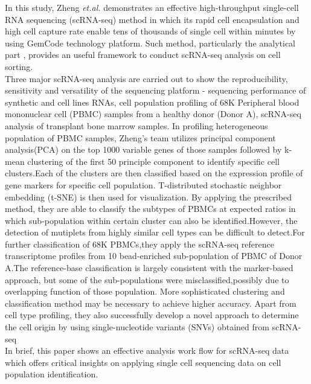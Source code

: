 \documentclass{article}
\begin{document}
\nocite{zheng2017massively}


  
\medskip

In this study, Zheng \textit{et.al.} demonstrates an effective high-throughput single-cell RNA sequencing (scRNA-seq) method in which its rapid cell encapsulation and high cell capture rate enable tens of thousands of single cell within minutes by using GemCode technology platform. Such method, particularly the analytical part , provides an useful framework to conduct scRNA-seq analysis on cell sorting.
\\

Three major scRNA-seq analysis are carried out to show the reproducibility, sensitivity and versatility of the sequencing platform - sequencing performance of synthetic and cell lines RNAs, cell population profiling of 68K Peripheral blood mononuclear cell (PBMC) samples from a healthy donor (Donor A), scRNA-seq analysis of transplant bone marrow samples. In profiling heterogeneous population of PBMC samples, Zheng's team utilizes principal component analysis(PCA) on the top 1000 variable genes of those samples followed by k-mean clustering of the first 50 principle component to identify specific cell clusters.Each of the clusters are then classified based on the expression profile of gene markers for specific cell population. T-distributed stochastic neighbor embedding (t-SNE) is then used for visualization. By applying the prescribed method, they are able to classify the subtypes of PBMCs at expected ratios in which sub-population within certain cluster can also be identified.However, the detection of mutiplets from highly similar cell types can be difficult to detect.For further classification of 68K PBMCs,they apply the scRNA-seq reference transcriptome profiles from 10 bead-enriched sub-population of PBMC of Donor A.The reference-base classification is largely consistent with the marker-based approach, but some of the sub-populations were misclassified,possibly due to overlapping function of those population. More sophisticated clustering and classification method may be necessary to achieve higher accuracy. Apart from cell type profiling, they also successfully develop a novel approach to determine the cell origin by using single-nucleotide variants (SNVs) obtained from scRNA-seq  
\\

In brief, this paper shows an effective analysis work flow for scRNA-seq data which offers critical insights on applying single cell sequencing data on cell population identification. 
\end{document}

